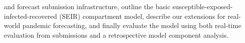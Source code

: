 \documentclass[11pt]{amsart}
\begin{document}
and forecast submission infrastructure, outline the basic susceptible-exposed-infected-recovered (SEIR) compartment model, describe our extensions for real-world pandemic forecasting, and finally evaluate the model using both real-time evaluation from submissions and a retrospective model component analysis. 



%
%
\end{document}
